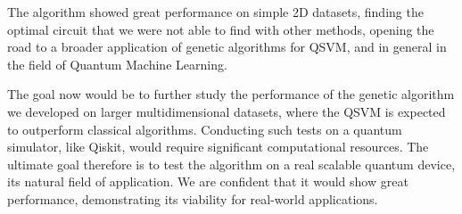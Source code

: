 \documentclass[12pt]{article}
\begin{document}
The algorithm showed great performance on simple 2D datasets, finding the optimal circuit that we were not able to find with other methods, opening the road to a broader application of genetic algorithms for QSVM, and in general in the field of Quantum Machine Learning. 

The goal now would be to further study the performance of the genetic algorithm we developed on larger multidimensional datasets, where the QSVM is expected to outperform classical algorithms. Conducting such tests on a quantum simulator, like Qiskit, would require significant computational resources. The ultimate goal therefore is to test the algorithm on a real scalable quantum device, its natural field of application. We are confident that it would show great performance, demonstrating its viability for real-world applications.


\newpage
\end{document}
